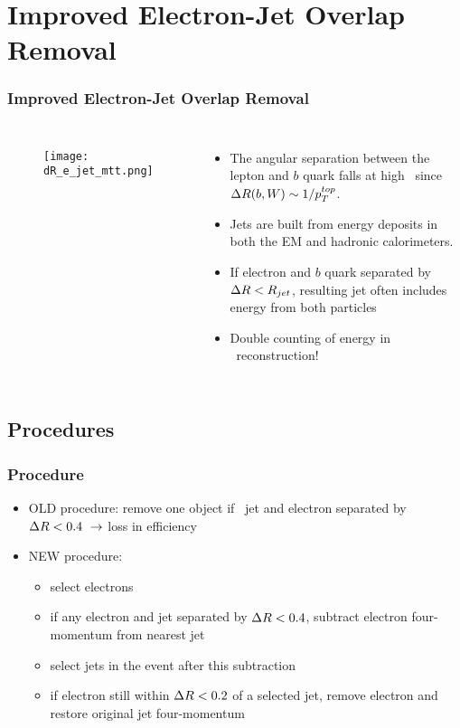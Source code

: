 \section{Improved Electron-Jet Overlap Removal}

\begin{frame}
    \frametitle{Improved Electron-Jet Overlap Removal}
\begin{columns}
\begin{figure}
\centering
\texttt{[image: dR\_e\_jet\_mtt.png]}
\end{figure}
\begin{itemize}
    \item The angular separation between the lepton and $b$ quark falls at
        high \mtt\ since $\Delta R(b,W) \sim 1/p_T^{top}$.
    \item Jets are built from energy deposits in both the EM and
        hadronic calorimeters.
    \item If electron and $b$ quark separated by $\Delta R < R_{jet}$,
        resulting jet often includes energy from both particles
    \item Double counting of energy in \mtt\ reconstruction!
\end{itemize}
\end{columns}
\end{frame}

\subsection{Procedures}

\begin{frame}
    \frametitle{Procedure}
\begin{itemize}
    \item OLD procedure: remove one object if \smallr\ jet and
        electron separated by $\Delta R < 0.4\ \to$ loss in efficiency
    \item NEW procedure:
    \begin{itemize}
        \item select electrons
        \item if any electron and jet separated by $\Delta R < 0.4$,
            subtract electron four-momentum from nearest jet
        \item select jets in the event after this subtraction
        \item if electron still within $\Delta R < 0.2$ of a selected jet,
            remove electron and restore original jet four-momentum
    \end{itemize}
\end{itemize}
\end{frame}

